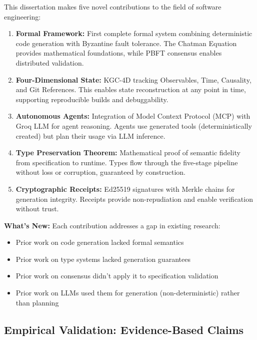 This dissertation makes five novel contributions to the field of software engineering:

\begin{enumerate}
    \item \textbf{Formal Framework:} First complete formal system combining deterministic code generation with Byzantine fault tolerance. The Chatman Equation provides mathematical foundations, while PBFT consensus enables distributed validation.

    \item \textbf{Four-Dimensional State:} KGC-4D tracking Observables, Time, Causality, and Git References. This enables state reconstruction at any point in time, supporting reproducible builds and debuggability.

    \item \textbf{Autonomous Agents:} Integration of Model Context Protocol (MCP) with Groq LLM for agent reasoning. Agents use generated tools (deterministically created) but plan their usage via LLM inference.

    \item \textbf{Type Preservation Theorem:} Mathematical proof of semantic fidelity from specification to runtime. Types flow through the five-stage pipeline without loss or corruption, guaranteed by construction.

    \item \textbf{Cryptographic Receipts:} Ed25519 signatures with Merkle chains for generation integrity. Receipts provide non-repudiation and enable verification without trust.
\end{enumerate}

\textbf{What's New:} Each contribution addresses a gap in existing research:
\begin{itemize}
    \item Prior work on code generation lacked formal semantics
    \item Prior work on type systems lacked generation guarantees
    \item Prior work on consensus didn't apply it to specification validation
    \item Prior work on LLMs used them for generation (non-deterministic) rather than planning
\end{itemize}

\subsection{Empirical Validation: Evidence-Based Claims}

